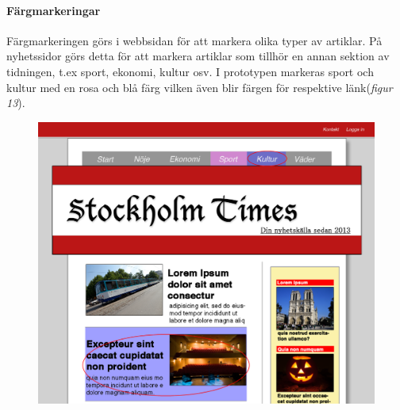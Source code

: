 \documentclass[11pt]{article}
\begin{document}
\paragraph{Färgmarkeringar}\mbox{}

Färgmarkeringen görs i webbsidan för att markera olika typer av artiklar. På nyhetssidor görs detta för att markera artiklar som tillhör en annan sektion av tidningen, t.ex sport, ekonomi, kultur osv. I prototypen markeras sport och kultur med en rosa och blå färg vilken även blir färgen för respektive länk(\textit{figur 13}).
\\

\begin{figure}[H]
\centerline{%
\includegraphics[scale=0.25]{pics/fargdesktop.png}\hspace{2em}%
}
\end{figure}
\end{document}
